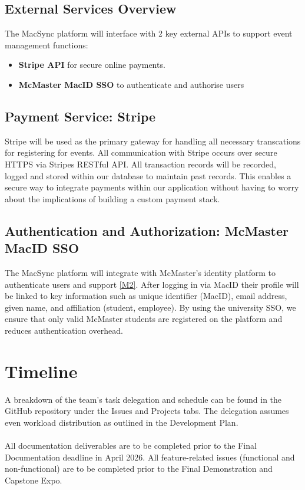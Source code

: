 \documentclass[12pt, titlepage]{article}
\begin{document}
\subsection{External Services Overview}

The MacSync platform will interface with 2 key external APIs to support event management functions:
\begin{itemize}
    \item \textbf{Stripe API} for secure online payments.
    \item \textbf{McMaster MacID SSO} to authenticate and authorise users
\end{itemize}

\subsection{Payment Service: Stripe}

Stripe will be used as the primary gateway for handling all necessary transcations for registering for events. All communication with Stripe occurs over secure HTTPS via Stripes RESTful API. All transaction records will be recorded, logged and stored within our database to maintain past records. This enables a secure way to integrate payments within our application without having to worry about the implications of building a custom payment stack.

\subsection{Authentication and Authorization: McMaster MacID SSO}

The MacSync platform will integrate with McMaster's identity platform to authenticate users and support \ref{M2}. After logging in via MacID their profile will be linked to key information such as unique identifier (MacID), email address, given name, and affiliation (student, employee). By using the university SSO, we ensure that only valid McMaster students are registered on the platform and reduces authentication overhead.

\section{Timeline} \label{SecTimeline}

A breakdown of the team's task delegation and schedule can be found in the GitHub repository
under the Issues and Projects tabs. The delegation assumes even workload distribution as outlined
in the Development Plan.\\\\
\noindent
All documentation deliverables are to be completed prior to the Final Documentation deadline
in April 2026. All feature-related issues (functional and non-functional) are to be completed prior to
the Final Demonstration and Capstone Expo. \\
\end{document}

